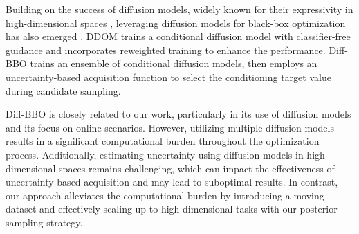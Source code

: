 Building on the success of diffusion models, widely known for their expressivity in high-dimensional spaces \cite{ramesh2022hierarchical, ho2022imagen}, leveraging diffusion models for black-box optimization has also emerged 
\cite{krishnamoorthy2023diffusion, wu2024diff, kong2024diffusion, yun2024guided}. 
DDOM \cite{krishnamoorthy2023diffusion} trains a conditional diffusion model with classifier-free guidance \cite{ho2021classifier} and incorporates reweighted training to enhance the performance. 
Diff-BBO \cite{wu2024diff} trains an ensemble of conditional diffusion models, then employs an uncertainty-based acquisition function to select the conditioning target value during candidate sampling.


Diff-BBO is closely related to our work, particularly in its use of diffusion models and its focus on online scenarios. However, utilizing multiple diffusion models results in a significant computational burden throughout the optimization process. Additionally, estimating uncertainty using diffusion models in high-dimensional spaces remains challenging, which can impact the effectiveness of uncertainty-based acquisition and may lead to suboptimal results.
In contrast, our approach alleviates the computational burden by introducing a moving dataset and effectively scaling up to high-dimensional tasks with our posterior sampling strategy.


